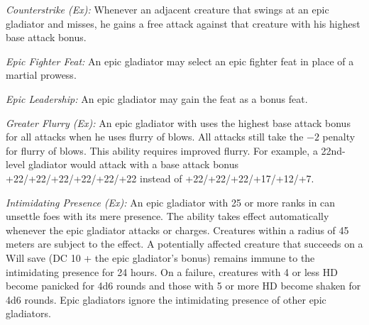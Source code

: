 

\textit{Counterstrike (Ex):} Whenever an adjacent creature that swings at an epic gladiator and misses, he gains a free attack against that creature with his highest base attack bonus.

\textit{Epic Fighter Feat:} An epic gladiator may select an epic fighter feat in place of a martial prowess.

\textit{Epic Leadership:} An epic gladiator may gain the  feat as a bonus feat.


\textit{Greater Flurry (Ex):} An epic gladiator with uses the highest base attack bonus for all attacks when he uses flurry of blows. All attacks still take the $-2$ penalty for flurry of blows. This ability requires improved flurry. For example, a 22nd-level gladiator would attack with a base attack bonus +22/+22/+22/+22/+22/+22 instead of +22/+22/+22/+17/+12/+7.

\textit{Intimidating Presence (Ex):} An epic gladiator with 25 or more ranks in  can unsettle foes with its mere presence. The ability takes effect automatically whenever the epic gladiator attacks or charges. Creatures within a radius of 45 meters are subject to the effect. A potentially affected creature that succeeds on a Will save (DC 10 + the epic gladiator's  bonus) remains immune to the intimidating presence for 24 hours. On a failure, creatures with 4 or less HD become panicked for 4d6 rounds and those with 5 or more HD become shaken for 4d6 rounds. Epic gladiators ignore the intimidating presence of other epic gladiators.

